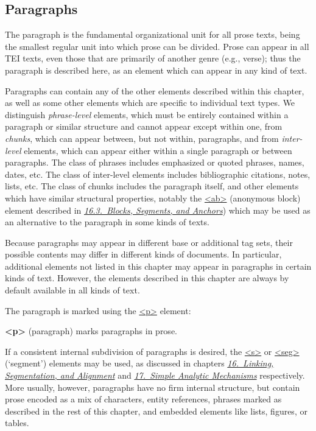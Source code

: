 \subsection[{Paragraphs}]{Paragraphs}\label{COPA}\par
The paragraph is the fundamental organizational unit for all prose texts, being the smallest regular unit into which prose can be divided. Prose can appear in all TEI texts, even those that are primarily of another genre (e.g., verse); thus the paragraph is described here, as an element which can appear in any kind of text.\par
Paragraphs can contain any of the other elements described within this chapter, as well as some other elements which are specific to individual text types. We distinguish \textit{phrase-level} elements, which must be entirely contained within a paragraph or similar structure and cannot appear except within one, from \textit{chunks}, which can appear between, but not within, paragraphs, and from \textit{inter-level} elements, which can appear either within a single paragraph or between paragraphs. The class of phrases includes emphasized or quoted phrases, names, dates, etc. The class of inter-level elements includes bibliographic citations, notes, lists, etc. The class of chunks includes the paragraph itself, and other elements which have similar structural properties, notably the \hyperref[TEI.ab]{<ab>} (anonymous block) element described in \textit{\hyperref[SASE]{16.3.\ Blocks, Segments, and Anchors}}) which may be used as an alternative to the paragraph in some kinds of texts.\par
Because paragraphs may appear in different base or additional tag sets, their possible contents may differ in different kinds of documents. In particular, additional elements not listed in this chapter may appear in paragraphs in certain kinds of text. However, the elements described in this chapter are always by default available in all kinds of text.\par
The paragraph is marked using the \hyperref[TEI.p]{<p>} element: 
\begin{sansreflist}
  
\item [\textbf{<p>}] (paragraph) marks paragraphs in prose.
\end{sansreflist}
\par
If a consistent internal subdivision of paragraphs is desired, the \hyperref[TEI.s]{<s>} or \hyperref[TEI.seg]{<seg>} (‘segment’) elements may be used, as discussed in chapters \textit{\hyperref[SA]{16.\ Linking, Segmentation, and Alignment}} and \textit{\hyperref[AI]{17.\ Simple Analytic Mechanisms}} respectively. More usually, however, paragraphs have no firm internal structure, but contain prose encoded as a mix of characters, entity references, phrases marked as described in the rest of this chapter, and embedded elements like lists, figures, or tables.\par
